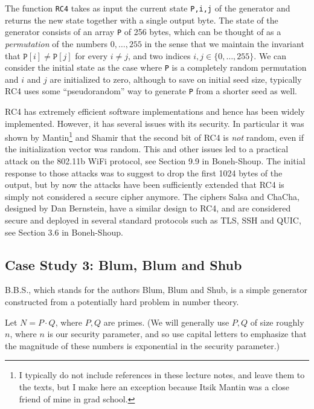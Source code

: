 The function \texttt{RC4} takes as input the current state
\texttt{P,i,j} of the generator and returns the new state together with
a single output byte. The state of the generator consists of an array
\texttt{P} of 256 bytes, which can be thought of as a \emph{permutation}
of the numbers \(0,\ldots,255\) in the sense that we maintain the
invariant that \(\texttt{P}[i]\neq\texttt{P}[j]\) for every \(i\neq j\),
and two indices \(i,j \in \{0,\ldots,255\}\). We can consider the
initial state as the case where \texttt{P} is a completely random
permutation and \(i\) and \(j\) are initialized to zero, although to
save on initial seed size, typically RC4 uses some ``pseudorandom'' way
to generate \texttt{P} from a shorter seed as well.

RC4 has extremely efficient software implementations and hence has been
widely implemented. However, it has several issues with its security. In
particular it was shown by Mantin\footnote{I typically do not include
  references in these lecture notes, and leave them to the texts, but I
  make here an exception because Itsik Mantin was a close friend of mine
  in grad school.} and Shamir that the second bit of RC4 is \emph{not}
random, even if the initialization vector was random. This and other
issues led to a practical attack on the 802.11b WiFi protocol, see
Section 9.9 in Boneh-Shoup. The initial response to those attacks was to
suggest to drop the first 1024 bytes of the output, but by now the
attacks have been sufficiently extended that RC4 is simply not
considered a secure cipher anymore. The ciphers Salsa and ChaCha,
designed by Dan Bernstein, have a similar design to RC4, and are
considered secure and deployed in several standard protocols such as
TLS, SSH and QUIC, see Section 3.6 in Boneh-Shoup.

\subsection{Case Study 3: Blum, Blum and
Shub}\label{3-Case-Study--Blum-Blum-}

B.B.S., which stands for the authors Blum, Blum and Shub, is a simple
generator constructed from a potentially hard problem in number theory.

Let \(N=P\cdot Q\), where \(P,Q\) are primes. (We will generally use
\(P,Q\) of size roughly \(n\), where \(n\) is our security parameter,
and so use capital letters to emphasize that the magnitude of these
numbers is exponential in the security parameter.)

